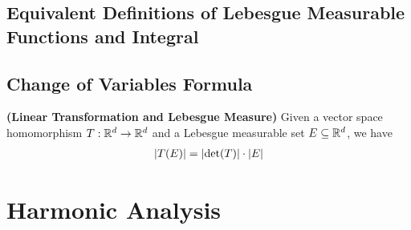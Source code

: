 \documentclass{report}
\begin{document}
\section{Equivalent Definitions of Lebesgue Measurable Functions and Integral}
\section{Change of Variables Formula}
\begin{theorem}
  \textbf{(Linear Transformation and Lebesgue Measure)} Given a vector space homomorphism $T:\mathbb{R}^d\rightarrow \mathbb{R}^d$ and a Lebesgue measurable set $E\subseteq \mathbb{R}^d$, we have 
\begin{align*}
\left|T(E)\right| = \left|\operatorname{det}(T)\right|\cdot \left|E\right|  
\end{align*}
\end{theorem}
\chapter{Harmonic Analysis}
\end{document}
